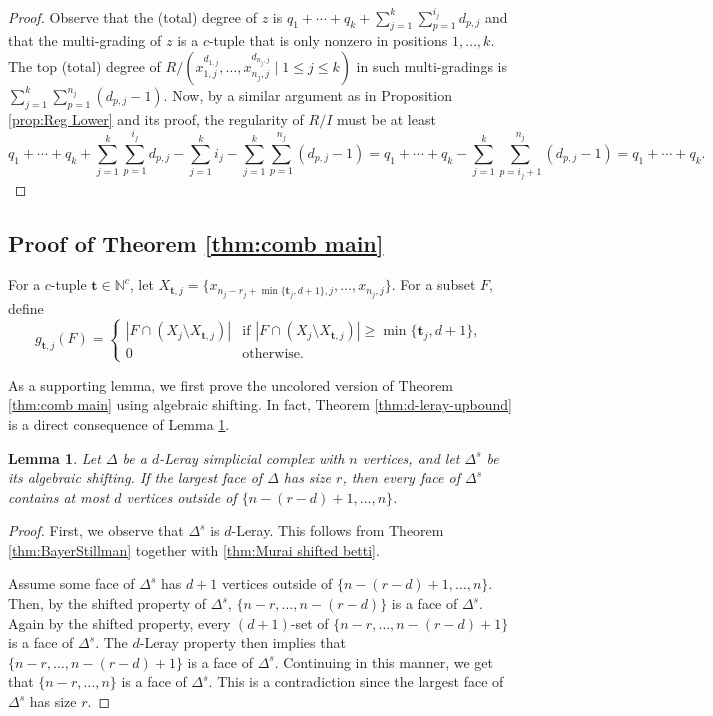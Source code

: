 \documentclass[a4paper, 10pt, reqno, english, ones]{amsart}  %
\newtheorem{lemma}[theorem]{Lemma}
\theoremstyle{definition}
\theoremstyle{remark}
\begin{document}
\begin{proof}
    Observe that the (total) degree of $z$ is $q_1+\cdots+q_k+\sum_{j=1}^k \sum_{p=1}^{i_j} d_{p,j}$ and that the multi-grading of $z$ is a $c$-tuple that is only nonzero in positions $1,\dots,k$. The top (total) degree of $R/(x_{1,j}^{d_{1,j}},\dots,x_{n_{j},j}^{d_{n_{j},j}} \mid 1\leq j\leq k)$ in such multi-gradings is $\sum_{j=1}^k \sum_{p=1}^{n_{j}} (d_{p,j}-1)$. Now, by a similar argument as in Proposition \ref{prop:Reg Lower} and its proof, the regularity of $R/I$ must be at least 
    \[
    q_1+\cdots+q_k+\sum_{j=1}^k \sum_{p=1}^{i_j} d_{p,j} -\sum_{j=1}^ki_j - \sum_{j=1}^k \sum_{p=1}^{n_{j}} (d_{p,j}-1) = q_1+\cdots+q_k-\sum_{j=1}^k\sum_{p=i_j+1}^{n_{j}} (d_{p,j}-1)=q_1+\cdots+q_k. 
    \]
\end{proof}

\subsection{Proof of Theorem \ref{thm:comb main}}\label{sec:Comb main sec}

For a $c$-tuple $\mathbf{t}\in \mathbb{N}^c$, let $X_{\mathbf{t},j}=\{x_{n_j-r_j+\min\{\mathbf{t}_j,d+1\},j},\dots,x_{n_j,j}\}$. For a subset $F$, define 
\[
g_{\mathbf{t},j}(F)=\begin{cases}
|F\cap (X_j\setminus{X_{\mathbf{t},j}})| & \textrm{if } |F\cap (X_j\setminus{X_{\mathbf{t},j}})|\geq \min\{\mathbf{t}_j,d+1\},\\
 0 &\textrm {otherwise.}
\end{cases}
\]

As a supporting lemma, we first prove the uncolored version of Theorem \ref{thm:comb main} using algebraic shifting. In fact, Theorem \ref{thm:d-leray-upbound} is a direct consequence of Lemma \ref{lem: 1- color comb main}.

\begin{lemma}\label{lem: 1- color comb main}
    Let $\Delta$ be a $d$-Leray simplicial complex with $n$ vertices, and let $\Delta^s$ be its algebraic shifting. If the largest face of $\Delta$ has size $r$, then every face of $\Delta^s$ contains at most $d$ vertices outside of $\{n-(r-d)+1,\dots,n\}$.
\end{lemma}
\begin{proof}
    First, we observe that $\Delta^s$ is $d$-Leray. This follows from Theorem \ref{thm:BayerStillman} together with \ref{thm:Murai shifted betti}.
    
    Assume some face of $\Delta^s$ has $d+1$ vertices outside of $\{n-(r-d)+1,\dots,n\}$. Then, by the shifted property of $\Delta^s$, $\{n-r,\dots,n-(r-d) \}$ is a face of $\Delta^s$. Again by the shifted property, every $(d+1)$-set of $\{n-r,\dots,n-(r-d)+1 \}$ is a face of $\Delta^s$. The $d$-Leray property then implies that $\{n-r,\dots,n-(r-d)+1 \}$ is a face of $\Delta^s$. Continuing in this manner, we get that $\{n-r,\dots,n \}$ is a face of $\Delta^s$. This is a contradiction since the largest face of $\Delta^s$ has size  $r$.
    \end{proof}
\end{document}
